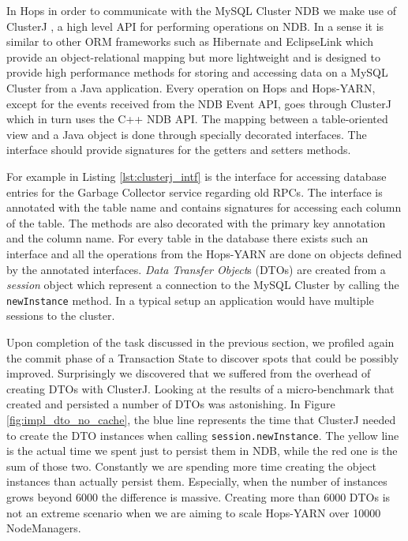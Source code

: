 In Hops in order to communicate with the MySQL Cluster NDB we make use
of ClusterJ \cite{clusterj}, a high level API for performing
operations on NDB. In a sense it is similar to other ORM frameworks
such as Hibernate \cite{hibernate} and EclipseLink \cite{eclipselink}
which provide an object-relational mapping but more lightweight and is
designed to provide high performance methods for storing and accessing
data on a MySQL Cluster from a Java application. Every operation on
Hops and Hops-YARN, except for the events received from the NDB Event
API, goes through ClusterJ which in turn uses the C++ NDB API. The
mapping between a table-oriented view and a Java object is done
through specially decorated interfaces. The interface should provide signatures
for the getters and setters methods.

For example in Listing \ref{lst:clusterj_intf} is the interface for
accessing database entries for the Garbage Collector service regarding
old RPCs. The interface is annotated with the table name and contains
signatures for accessing each column of the table. The methods are
also decorated with the primary key annotation and the column
name. For every table in the database there exists such an interface
and all the operations from the Hops-YARN are done on objects defined
by the annotated interfaces. \emph{Data Transfer Object}s (DTOs) are
created from a \emph{session} object which represent a connection to
the MySQL Cluster by calling the \texttt{newInstance} method. In a
typical setup an application would have multiple sessions to the
cluster. 



Upon completion of the task discussed in the previous section, we
profiled again the commit phase of a Transaction State to discover
spots that could be possibly improved. Surprisingly we discovered that
we suffered from the overhead of creating DTOs with ClusterJ. Looking
at the results of a micro-benchmark that created and persisted a
number of DTOs was astonishing. In Figure \ref{fig:impl_dto_no_cache},
the blue line represents the time that ClusterJ needed to create the
DTO instances when calling \texttt{session.newInstance}. The yellow
line is the actual time we spent just to persist them in NDB, while
the red one is the sum of those two. Constantly we are spending more
time creating the object instances than actually persist
them. Especially, when the number of instances grows beyond 6000 the
difference is massive. Creating more than 6000 DTOs is not an extreme
scenario when we are aiming to scale Hops-YARN over 10000
NodeManagers.

